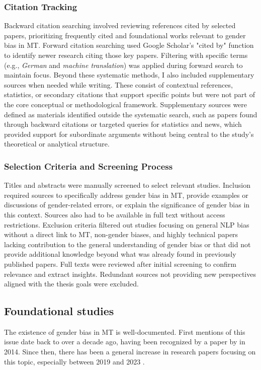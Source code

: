         \subsubsection{Citation Tracking}
        Backward citation searching involved reviewing references cited by selected papers, prioritizing frequently cited and foundational works relevant to gender bias in MT. Forward citation searching used Google Scholar's "cited by" function to identify newer research citing those key papers. Filtering with specific terms (e.g., \textit{German} and \textit{machine translation}) was applied during forward search to maintain focus. Beyond these systematic methods, I also included supplementary sources when needed while writing. These consist of contextual references, statistics, or secondary citations that support specific points but were not part of the core conceptual or methodological framework. Supplementary sources were defined as materials identified outside the systematic search, such as papers found through backward citations or targeted queries for statistics and news, which provided support for subordinate arguments without being central to the study's theoretical or analytical structure.

        \subsubsection{Selection Criteria and Screening Process}\label{subsection:selection_criteria}
        Titles and abstracts were manually screened to select relevant studies. Inclusion required sources to specifically address gender bias in MT, provide examples or discussions of gender-related errors, or explain the significance of gender bias in this context. Sources also had to be available in full text without access restrictions. Exclusion criteria filtered out studies focusing on general NLP bias without a direct link to MT, non-gender biases, and highly technical papers lacking contribution to the general understanding of gender bias or that did not provide additional knowledge beyond what was already found in previously published papers. Full texts were reviewed after initial screening to confirm relevance and extract insights. Redundant sources not providing new perspectives aligned with the thesis goals were excluded.

    \subsection{Foundational studies}
        The existence of gender bias in MT is well-documented. First mentions of this issue date back to over a decade ago, having been recognized by a paper by \citeauthor{schiebingerScientificResearchMust2014} in 2014. Since then, there has been a general increase in research papers focusing on this topic, especially between 2019 and 2023 \parencite{savoldiDecadeGenderBias2025}. 

